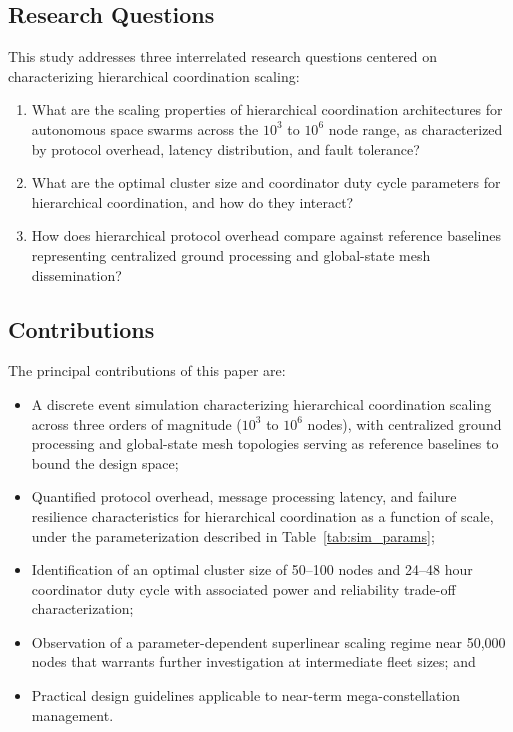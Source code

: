 \documentclass[journal]{IEEEtran}
\begin{document}
\subsection{Research Questions}

This study addresses three interrelated research questions centered on characterizing hierarchical coordination scaling:

\begin{enumerate}
    \item[\textbf{RQ1:}] What are the scaling properties of hierarchical coordination architectures for autonomous space swarms across the $10^3$ to $10^6$ node range, as characterized by protocol overhead, latency distribution, and fault tolerance?
    \item[\textbf{RQ2:}] What are the optimal cluster size and coordinator duty cycle parameters for hierarchical coordination, and how do they interact?
    \item[\textbf{RQ3:}] How does hierarchical protocol overhead compare against reference baselines representing centralized ground processing and global-state mesh dissemination?
\end{enumerate}

\subsection{Contributions}

The principal contributions of this paper are:
\begin{itemize}
    \item A discrete event simulation characterizing hierarchical coordination scaling across three orders of magnitude ($10^3$ to $10^6$ nodes), with centralized ground processing and global-state mesh topologies serving as reference baselines to bound the design space;
    \item Quantified protocol overhead, message processing latency, and failure resilience characteristics for hierarchical coordination as a function of scale, under the parameterization described in Table~\ref{tab:sim_params};
    \item Identification of an optimal cluster size of 50--100 nodes and 24--48 hour coordinator duty cycle with associated power and reliability trade-off characterization;
    \item Observation of a parameter-dependent superlinear scaling regime near 50{,}000 nodes that warrants further investigation at intermediate fleet sizes; and
    \item Practical design guidelines applicable to near-term mega-constellation management.
\end{itemize}
\end{document}
